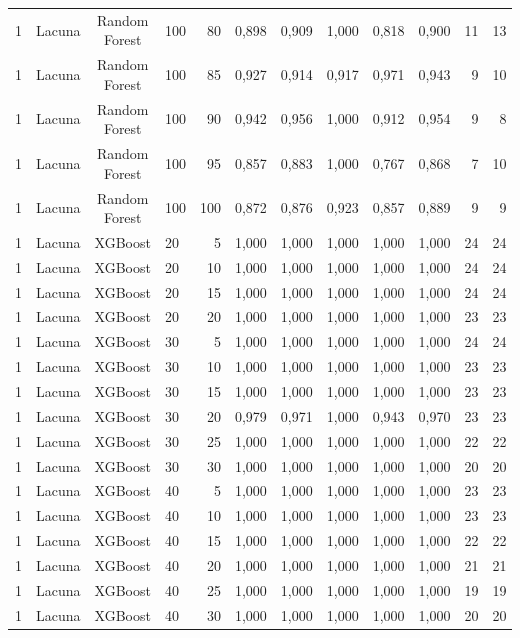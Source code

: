 \begin{longtable}{ccclrrrrrrrr}
1 & Lacuna & Random Forest & 100 & 80 & 0,898 & 0,909 & 1,000 & 0,818 & 0,900 & 11 & 13 \\
1 & Lacuna & Random Forest & 100 & 85 & 0,927 & 0,914 & 0,917 & 0,971 & 0,943 & 9 & 10 \\
1 & Lacuna & Random Forest & 100 & 90 & 0,942 & 0,956 & 1,000 & 0,912 & 0,954 & 9 & 8 \\
1 & Lacuna & Random Forest & 100 & 95 & 0,857 & 0,883 & 1,000 & 0,767 & 0,868 & 7 & 10 \\
1 & Lacuna & Random Forest & 100 & 100 & 0,872 & 0,876 & 0,923 & 0,857 & 0,889 & 9 & 9 \\
1 & Lacuna & XGBoost & 20 & 5 & 1,000 & 1,000 & 1,000 & 1,000 & 1,000 & 24 & 24 \\
1 & Lacuna & XGBoost & 20 & 10 & 1,000 & 1,000 & 1,000 & 1,000 & 1,000 & 24 & 24 \\
1 & Lacuna & XGBoost & 20 & 15 & 1,000 & 1,000 & 1,000 & 1,000 & 1,000 & 24 & 24 \\
1 & Lacuna & XGBoost & 20 & 20 & 1,000 & 1,000 & 1,000 & 1,000 & 1,000 & 23 & 23 \\
1 & Lacuna & XGBoost & 30 & 5 & 1,000 & 1,000 & 1,000 & 1,000 & 1,000 & 24 & 24 \\
1 & Lacuna & XGBoost & 30 & 10 & 1,000 & 1,000 & 1,000 & 1,000 & 1,000 & 23 & 23 \\
1 & Lacuna & XGBoost & 30 & 15 & 1,000 & 1,000 & 1,000 & 1,000 & 1,000 & 23 & 23 \\
1 & Lacuna & XGBoost & 30 & 20 & 0,979 & 0,971 & 1,000 & 0,943 & 0,970 & 23 & 23 \\
1 & Lacuna & XGBoost & 30 & 25 & 1,000 & 1,000 & 1,000 & 1,000 & 1,000 & 22 & 22 \\
1 & Lacuna & XGBoost & 30 & 30 & 1,000 & 1,000 & 1,000 & 1,000 & 1,000 & 20 & 20 \\
1 & Lacuna & XGBoost & 40 & 5 & 1,000 & 1,000 & 1,000 & 1,000 & 1,000 & 23 & 23 \\
1 & Lacuna & XGBoost & 40 & 10 & 1,000 & 1,000 & 1,000 & 1,000 & 1,000 & 23 & 23 \\
1 & Lacuna & XGBoost & 40 & 15 & 1,000 & 1,000 & 1,000 & 1,000 & 1,000 & 22 & 22 \\
1 & Lacuna & XGBoost & 40 & 20 & 1,000 & 1,000 & 1,000 & 1,000 & 1,000 & 21 & 21 \\
1 & Lacuna & XGBoost & 40 & 25 & 1,000 & 1,000 & 1,000 & 1,000 & 1,000 & 19 & 19 \\
1 & Lacuna & XGBoost & 40 & 30 & 1,000 & 1,000 & 1,000 & 1,000 & 1,000 & 20 & 20 \\

\end{longtable}
